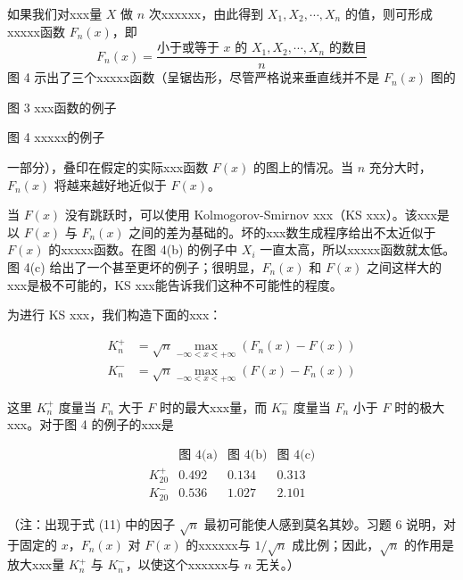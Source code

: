 如果我们对xxx量 $X$ 做 $n$ 次xxxxxx，由此得到 $X_1, X_2, \cdots, X_n$ 的值，则可形成xxxxx函数 $F_n(x)$，即
\begin{equation}
F_n(x) = \frac{\text{小于或等于 } x \text{ 的 } X_1, X_2, \cdots, X_n \text{ 的数目}}{n} \tag{10}
\end{equation}
图 4 示出了三个xxxxx函数（呈锯齿形，尽管严格说来垂直线并不是 $F_n(x)$ 图的

\begin{center}
图 3 \quad xxx函数的例子
\end{center}

\begin{center}
图 4 \quad xxxxx的例子
\end{center}

\noindent 一部分），叠印在假定的实际xxx函数 $F(x)$ 的图上的情况。当 $n$ 充分大时，$F_n(x)$ 将越来越好地近似于 $F(x)$。

当 $F(x)$ 没有跳跃时，可以使用 Kolmogorov-Smirnov xxx（KS xxx）。该xxx是以 $F(x)$ 与 $F_n(x)$ 之间的差为基础的。坏的xxx数生成程序给出不太近似于 $F(x)$ 的xxxxx函数。在图 4(b) 的例子中 $X_i$ 一直太高，所以xxxxx函数就太低。图 4(c) 给出了一个甚至更坏的例子；很明显，$F_n(x)$ 和 $F(x)$ 之间这样大的xxx是极不可能的，KS xxx能告诉我们这种不可能性的程度。

为进行 KS xxx，我们构造下面的xxx：

\begin{equation}
\begin{aligned}
K_n^+ &= \sqrt{n} \max_{-\infty < x < +\infty} (F_n(x) - F(x)) \\
K_n^- &= \sqrt{n} \max_{-\infty < x < +\infty} (F(x) - F_n(x))
\end{aligned} \tag{11}
\end{equation}

这里 $K_n^+$ 度量当 $F_n$ 大于 $F$ 时的最大xxx量，而 $K_n^-$ 度量当 $F_n$ 小于 $F$ 时的极大xxx。对于图 4 的例子的xxx是

\begin{equation}
\begin{array}{lccc}
 & \text{图 4(a)} & \text{图 4(b)} & \text{图 4(c)} \\
K_{20}^+ & 0.492 & 0.134 & 0.313 \\
K_{20}^- & 0.536 & 1.027 & 2.101
\end{array} \tag{12}
\end{equation}

（注：出现于式 (11) 中的因子 $\sqrt{n}$ 最初可能使人感到莫名其妙。习题 6 说明，对于固定的 $x$，$F_n(x)$ 对 $F(x)$ 的xxxxxx与 $1/\sqrt{n}$ 成比例；因此，$\sqrt{n}$ 的作用是放大xxx量 $K_n^+$ 与 $K_n^-$，以使这个xxxxxx与 $n$ 无关。）

